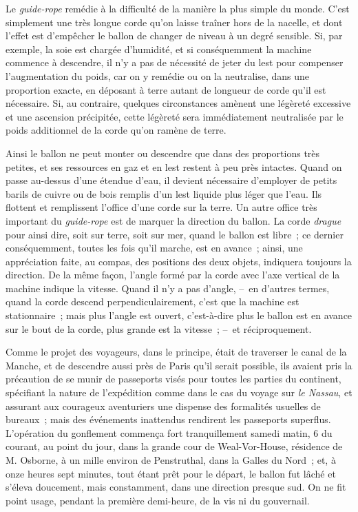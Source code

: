 \documentclass[french,twoside]{book} %
\begin{document}
Le \emph{guide-rope} remédie à la difficulté de la manière la plus simple du monde. C’est simplement une très longue corde qu’on laisse traîner hors de la nacelle, et dont l’effet est d’empêcher le ballon de changer de niveau à un degré sensible. Si, par exemple, la soie est chargée d’humidité, et si conséquemment la machine commence à descendre, il n’y a pas de nécessité de jeter du lest pour compenser l’augmentation du poids, car on y remédie ou on la neutralise, dans une proportion exacte, en déposant à terre autant de longueur de corde qu’il est nécessaire. Si, au contraire, quelques circonstances amènent une légèreté excessive et une ascension précipitée, cette légèreté sera immédiatement neutralisée par le poids additionnel de la corde qu’on ramène de terre.\par
Ainsi le ballon ne peut monter ou descendre que dans des proportions très petites, et ses ressources en gaz et en lest restent à peu près intactes. Quand on passe au-dessus d’une étendue d’eau, il devient nécessaire d’employer de petits barils de cuivre ou de bois remplis d’un lest liquide plus léger que l’eau. Ils flottent et remplissent l’office d’une corde sur la terre. Un autre office très important du \emph{guide-rope} est de marquer la direction du ballon. La corde \emph{drague} pour ainsi dire, soit sur terre, soit sur mer, quand le ballon est libre ; ce dernier conséquemment, toutes les fois qu’il marche, est en avance ; ainsi, une appréciation faite, au compas, des positions des deux objets, indiquera toujours la direction. De la même façon, l’angle formé par la corde avec l’axe vertical de la machine indique la vitesse. Quand il n’y a pas d’angle, – en d’autres termes, quand la corde descend perpendiculairement, c’est que la machine est stationnaire ; mais plus l’angle est ouvert, c’est-à-dire plus le ballon est en avance sur le bout de la corde, plus grande est la vitesse ; – et réciproquement.\par
Comme le projet des voyageurs, dans le principe, était de traverser le canal de la Manche, et de descendre aussi près de Paris qu’il serait possible, ils avaient pris la précaution de se munir de passeports visés pour toutes les parties du continent, spécifiant la nature de l’expédition comme dans le cas du voyage sur \emph{le Nassau}, et assurant aux courageux aventuriers une dispense des formalités usuelles de bureaux ; mais des événements inattendus rendirent les passeports superflus. L’opération du gonflement commença fort tranquillement samedi matin, 6 du courant, au point du jour, dans la grande cour de Weal-Vor-House, résidence de M. Osborne, à un mille environ de Penstruthal, dans la Galles du Nord ; et, à onze heures sept minutes, tout étant prêt pour le départ, le ballon fut lâché et s’éleva doucement, mais constamment, dans une direction presque sud. On ne fit point usage, pendant la première demi-heure, de la vis ni du gouvernail.\par
\end{document}
